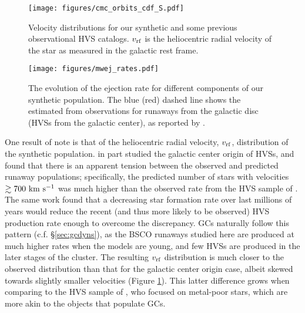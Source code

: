 \documentclass[twocolumn,linenumbers]{aastex631}
\begin{document}
\begin{figure}
    \begin{centering}
        \texttt{[image: figures/cmc\_orbits\_cdf\_S.pdf]}
        \caption{
            Velocity distributions for our synthetic and some previous observational HVS catalogs.
            $v_{\rm rf}$ is the heliocentric radial velocity of the star as measured in the galactic rest frame.
        }
        \label{fig:cmc_orbits_cdf}
    \end{centering}
\end{figure}

\begin{figure}
    \begin{centering}
        \texttt{[image: figures/mwej\_rates.pdf]}
        \caption{
            The evolution of the ejection rate for different components of our synthetic population.
            The blue (red) dashed line shows the estimated from observations for runaways from the galactic disc (HVSs from the galactic center), as reported by \citet{2015ARA&A..53...15B}.
        }
        \label{fig:mwej_rates}
    \end{centering}
\end{figure}

One result of note is that of the heliocentric radial velocity, $v_{\rm rf}$, distribution of the synthetic population.
\citet{2021arXiv211213864G} in part studied the galactic center origin of HVSs, and found that there is an apparent tension between the observed and predicted runaway populations; specifically, the predicted number of stars with velocities $\gtrsim 700~{\rm km~s^{-1}}$ was much higher than the observed rate from the HVS sample of \citet{2018ApJ...866...39B}.
The same work found that a decreasing star formation rate over last millions of years would reduce the recent (and thus more likely to be observed) HVS production rate enough to overcome the discrepancy.
GCs naturally follow this pattern (c.f. \S\ref{sec:gcdyns}), as the BSCO runaways studied here are produced at much higher rates when the models are young, and few HVSs are produced in the later stages of the cluster.
The resulting $v_{\rm rf}$ distribution is much closer to the observed distribution than that for the galactic center origin case, albeit skewed towards slightly smaller velocities (Figure \ref{fig:cmc_orbits_cdf}).
This latter difference grows when comparing to the HVS sample of \citet{2018ApJ...866..121H}, who focused on metal-poor stars, which are more akin to the objects that populate GCs.
\end{document}
